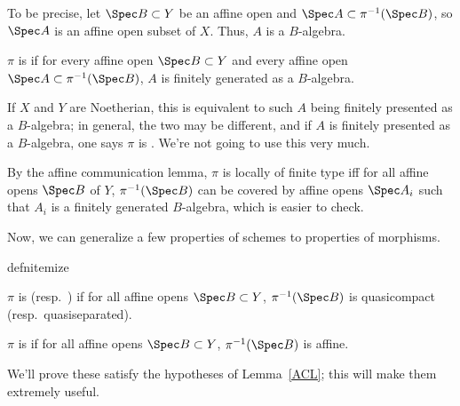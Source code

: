 To be precise, let \(\Spec B\subset Y\) be an affine open and \(\Spec A\subset\pi^{-1}(\Spec B)\), so \(\Spec A\)
is an affine open subset of \(X\). Thus, \(A\) is a \(B\)-algebra.
\begin{defn}
\(\pi\) is  if for every affine open \(\Spec B\subset Y\) and every affine open
\(\Spec A\subset\pi^{-1}(\Spec B)\), \(A\) is finitely generated as a \(B\)-algebra.
\end{defn}
If \(X\) and \(Y\) are Noetherian, this is equivalent to such \(A\) being finitely presented as a \(B\)-algebra; in
general, the two may be different, and if \(A\) is finitely presented as a \(B\)-algebra, one says \(\pi\) is
. We're not going to use this very much.

By the affine communication lemma, \(\pi\) is locally of finite type iff for all affine opens \(\Spec B\) of \(Y\),
\(\pi^{-1}(\Spec B)\) can be covered by affine opens \(\Spec A_i\) such that \(A_i\) is a finitely generated
\(B\)-algebra, which is easier to check.

Now, we can generalize a few properties of schemes to properties of morphisms.
\begin{comp}{defn}{itemize}
	\item \(\pi\) is  (resp.\ ) if for all affine opens \(\Spec B\subset
	Y\), \(\pi^{-1}(\Spec B)\) is quasicompact (resp.\ quasiseparated).
	\item \(\pi\) is  if for all affine opens \(\Spec B\subset Y\), \(\pi^{-1}(\Spec B)\) is affine.
\end{comp}
We'll prove these satisfy the hypotheses of Lemma~\ref{ACL}; this will make them extremely useful.
